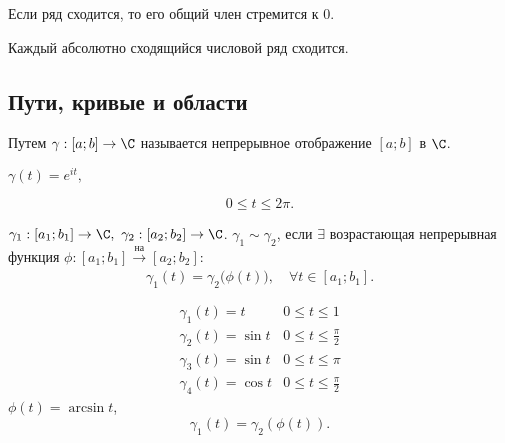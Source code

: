 \begin{corollary}
	Если ряд сходится, то его общий член стремится к $0$.
\end{corollary}

\begin{corollary}
	Каждый абсолютно сходящийся числовой ряд сходится.
\end{corollary}

\subsection{Пути, кривые и области}

\begin{definition}[Путь]
	Путем $\gamma:[a ; b] \rightarrow \C$ называется непрерывное отображение $[a ; b]$ в $\C$.
\end{definition}

\begin{eg}
	$\gamma(t) = e^{it},$
	\begin{multicols}{2}
		\begin{figure}[H]
			\centering
			\label{fig:fig-7}
		\end{figure}

		\columnbreak

		\[
			0 \leqslant t \leqslant 2\pi.
		\]
	\end{multicols}
\end{eg}

\begin{definition}
	$\gamma_1 : [a_1 ; b_1] \rightarrow \C, \ \gamma_2 : [a_2 ; b_2] \rightarrow \C$. $\gamma_1 \sim \gamma_2$, если $\exists $ возрастающая непрерывная функция $\phi: [a_1 ; b_1] \xrightarrow[]{\text{на}} [a_2 ; b_2]:$
	\[
		\gamma_1(t) = \gamma_2\big(\phi(t)\big), \quad \forall t \in [a_1 ; b_1].
	\]
\end{definition}

\begin{eg}
	\begin{multicols}{2}
		\[
			\begin{array}{ll}
				\gamma_1(t) = t      & 0 \leqslant t \leqslant 1             \\
				\gamma_2(t) = \sin t & 0 \leqslant t \leqslant \frac{\pi}{2} \\
				\gamma_3(t) = \sin t & 0 \leqslant t \leqslant \pi           \\
				\gamma_4(t) = \cos t & 0 \leqslant t \leqslant \frac{\pi}{2}
			\end{array}
		\]
		$\phi(t) = \arcsin t$,
		\[
			\gamma_1(t) = \gamma_2\left(\phi(t)\right).
		\]
		\begin{figure}[H]
			\centering
			\label{fig:fig-8}
		\end{figure}
	\end{multicols}
\end{eg}
